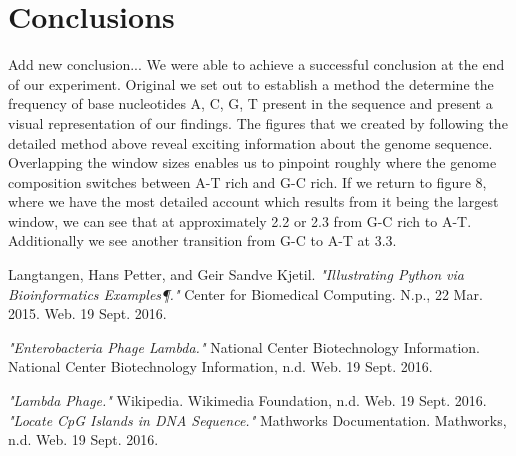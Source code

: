 \documentclass[paper=letter, fontsize=12pt]{article}
\begin{document}
		
\clearpage
\section{Conclusions}

Add new conclusion...
We were able to achieve a successful conclusion at the end of our experiment. Original we set out to establish a method the determine the frequency of base nucleotides A, C, G, T present in the sequence and present a visual representation of our findings. The figures that we created by following the detailed method above reveal exciting information about the genome sequence. Overlapping the window sizes enables us to pinpoint roughly where the genome composition switches between A-T rich and G-C rich. If we return to figure 8, where we have the most detailed account which results from it being the largest window, we can see that at approximately 2.2 or 2.3 from G-C rich to A-T. Additionally we see another transition from G-C to A-T at 3.3.  


\begin{thebibliography}{99}

Langtangen, Hans Petter, and Geir Sandve Kjetil. \textit{"Illustrating Python via Bioinformatics Examples¶."} Center for Biomedical Computing. N.p., 22 Mar. 2015. Web. 19 Sept. 2016.

\textit{"Enterobacteria Phage Lambda."} National Center Biotechnology Information. National Center Biotechnology Information, n.d. Web. 19 Sept. 2016.

\textit{"Lambda Phage."} Wikipedia. Wikimedia Foundation, n.d. Web. 19 Sept. 2016.
\textit{"Locate CpG Islands in DNA Sequence."} Mathworks Documentation. Mathworks, n.d. Web. 19 Sept. 2016.

\end{thebibliography}


\end{document}
